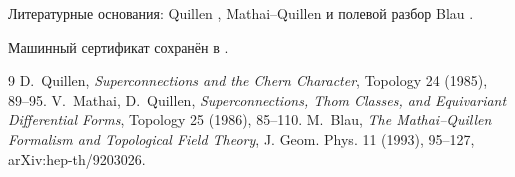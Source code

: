 Литературные основания: Quillen \cite{v10-sus-quillen},
Mathai--Quillen \cite{v10-sus-mathai-quillen} и полевой разбор Blau
\cite{v10-sus-blau}.

Машинный сертификат сохранён в
.

\begin{thebibliography}{9}
D.~Quillen, \emph{Superconnections and the Chern Character}, Topology 24
(1985), 89--95.
V.~Mathai, D.~Quillen, \emph{Superconnections, Thom Classes, and
Equivariant Differential Forms}, Topology 25 (1986), 85--110.
M.~Blau, \emph{The Mathai--Quillen Formalism and Topological Field Theory},
J. Geom. Phys. 11 (1993), 95--127, arXiv:hep-th/9203026.
\end{thebibliography}
